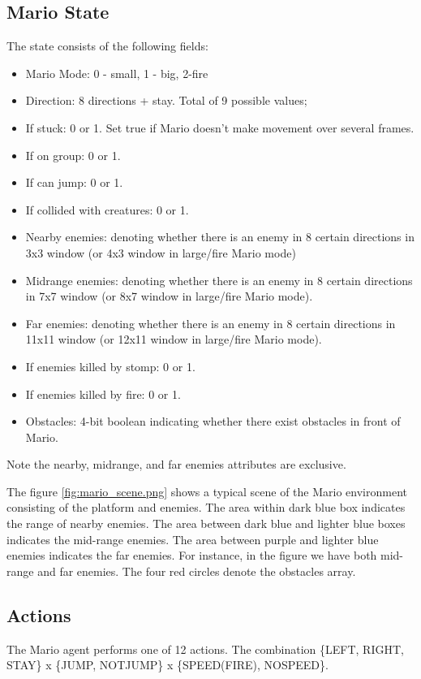 \subsection{Mario State}
The state consists of the following fields:
\begin{itemize}
\item
Mario Mode: 0 - small, 1 - big, 2-fire
\item
Direction: 8 directions + stay. Total of 9 possible values;
\item
If stuck: 0 or 1. Set true if Mario doesn't make movement over several frames.
\item 
If on group: 0 or 1. 
\item
If can jump: 0 or 1.
\item
If collided with creatures: 0 or 1.
\item
Nearby enemies: denoting whether there is an enemy in 8 certain directions in 3x3 window (or 4x3 window in large/fire Mario mode)
\item
Midrange enemies: denoting whether there is an enemy in 8 certain directions in 7x7 window (or 8x7 window in large/fire Mario mode).
\item
Far enemies: denoting whether there is an enemy in 8 certain directions in 11x11 window (or 12x11 window in large/fire Mario mode).
\item
If enemies killed by stomp: 0 or 1.
\item
If enemies killed by fire: 0 or 1.
\item
Obstacles: 4-bit boolean indicating whether there exist obstacles in front of Mario.
\end{itemize}

Note the nearby, midrange, and far enemies attributes are exclusive.

The figure \ref{fig:mario_scene.png} shows a typical scene of the Mario environment consisting of the platform and enemies. The area within dark blue box indicates the range of nearby enemies. The area between dark blue and lighter blue boxes indicates the mid-range enemies. The area between purple and lighter blue enemies indicates the far enemies. For instance, in the figure we have both mid-range and far enemies. The four red circles denote the obstacles array.

\subsection{Actions}
The Mario agent performs one of 12 actions. The combination \{LEFT, RIGHT, STAY\} x \{JUMP, NOTJUMP\} x \{SPEED(FIRE), NOSPEED\}.

